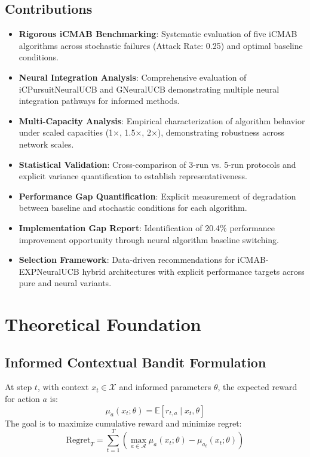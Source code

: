 \documentclass[12pt,a4paper]{article}
\begin{document}
\subsection{Contributions}
\begin{itemize}
\item \textbf{Rigorous iCMAB Benchmarking}: Systematic evaluation of five iCMAB algorithms across stochastic failures (Attack Rate: 0.25) and optimal baseline conditions.
\item \textbf{Neural Integration Analysis}: Comprehensive evaluation of iCPursuitNeuralUCB and GNeuralUCB demonstrating multiple neural integration pathways for informed methods.
\item \textbf{Multi-Capacity Analysis}: Empirical characterization of algorithm behavior under scaled capacities (1$\times$, 1.5$\times$, 2$\times$), demonstrating robustness across network scales.
\item \textbf{Statistical Validation}: Cross-comparison of 3-run vs. 5-run protocols and explicit variance quantification to establish representativeness.
\item \textbf{Performance Gap Quantification}: Explicit measurement of degradation between baseline and stochastic conditions for each algorithm.
\item \textbf{Implementation Gap Report}: Identification of 20.4\% performance improvement opportunity through neural algorithm baseline switching.
\item \textbf{Selection Framework}: Data-driven recommendations for iCMAB-EXPNeuralUCB hybrid architectures with explicit performance targets across pure and neural variants.
\end{itemize}

\section{Theoretical Foundation}

\subsection{Informed Contextual Bandit Formulation}
At step $t$, with context $x_t \in \mathcal{X}$ and informed parameters $\theta$, the expected reward for action $a$ is:
\[
\mu_a(x_t; \theta) = \mathbb{E}[r_{t,a} \mid x_t, \theta]
\]
The goal is to maximize cumulative reward and minimize regret:
\[
\mathrm{Regret}_T = \sum_{t=1}^{T}\left(\max_{a \in \mathcal{A}} \mu_a(x_t;\theta) - \mu_{a_t}(x_t;\theta)\right)
\]
\end{document}
